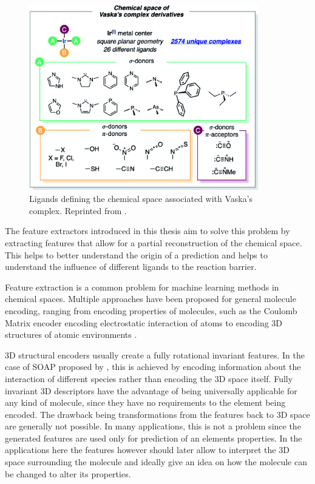\begin{figure}[H]
  \centering
  \includegraphics[width=10cm]{figures/introduction/chem-space.png}
  \caption[Vaska's space]{Ligands defining the chemical space associated with Vaska's complex. Reprinted from \cite{friederich_dos}.}
  \label{fig:chemspace}
\end{figure}

The feature extractors introduced in this thesis aim to solve this problem by extracting features that allow for a
partial reconstruction of the chemical space.
This helps to better understand the origin of a prediction and helps to understand the influence of different ligands to the reaction barrier.

Feature extraction is a common problem for machine learning methods in chemical spaces.
Multiple approaches have been proposed for general molecule encoding, 
ranging from encoding properties of molecules, such as the Coulomb Matrix encoder encoding electrostatic interaction of atoms \cite{PhysRevLett.108.058301}
to encoding 3D structures of atomic environments \cite{Bart_k_2013}.

3D structural encoders usually create a fully rotational invariant features.
In the case of SOAP proposed by \citeauthor{Bart_k_2013}, this is achieved by encoding information about the interaction of 
different species rather than encoding the 3D space itself.
Fully invariant 3D descriptors have the advantage of being universally applicable for any kind of molecule, since they have no requirements to the element being encoded.
The drawback being transformations from the features back to 3D space are generally not possible.
In many applications, this is not a problem since the generated features are used only for prediction of an elements properties.
In the applications here the features however should later allow to interpret the 3D space surrounding the molecule and ideally give an idea on how the molecule can be changed to alter its properties.

